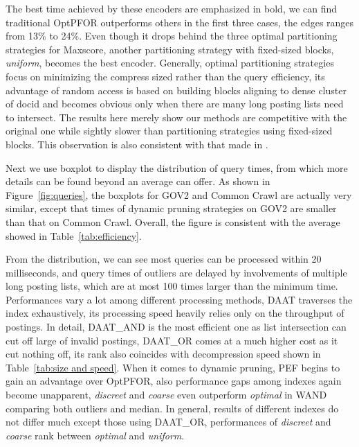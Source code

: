 \documentclass[runningheads,a4paper]{llncs}
\begin{document}
The best time achieved by these encoders are emphasized in bold, we can find traditional OptPFOR outperforms others in the first three cases, the edges ranges from 13\% to 24\%.
Even though it drops behind the three optimal partitioning strategies for Maxscore, another partitioning strategy with fixed-sized blocks, \textit{uniform}, becomes the best encoder.
Generally, optimal partitioning strategies focus on minimizing the compress sized rather than the query efficiency, its advantage of random access is based on building blocks aligning to dense cluster of docid and becomes obvious only when there are many long posting lists need to intersect.
The results here merely show our methods are competitive with the original one while sightly slower than partitioning strategies using fixed-sized blocks.
This observation is also consistent with that made in \cite{ottaviano2014partitioned}.

Next we use boxplot to display the distribution of query times, from which more details can be found beyond an average can offer.
As shown in Figure~\ref{fig:queries}, the boxplots for GOV2 and Common Crawl are actually very similar, except that times of dynamic pruning strategies on GOV2 are smaller than that on Common Crawl.
Overall, the figure is consistent with the average showed in Table~\ref{tab:efficiency}.

From the distribution, we can see most queries can be processed within 20 milliseconds, and query times of outliers are delayed by involvements of multiple long posting lists, which are at most 100 times larger than the minimum time.
Performances vary a lot among different processing methods, DAAT traverses the index exhaustively, its processing speed heavily relies only on the throughput of postings.
In detail, DAAT\_AND is the most efficient one as list intersection can cut off large of invalid postings, DAAT\_OR comes at a much higher cost as it cut nothing off, its rank also coincides with decompression speed shown in Table~\ref{tab:size and speed}.
When it comes to dynamic pruning, PEF begins to gain an advantage over OptPFOR, also performance gaps among indexes again become unapparent, \textit{discreet} and \textit{coarse} even outperform \textit{optimal} in WAND comparing both outliers and median.
In general, results of different indexes do not differ much except those using DAAT\_OR, performances of \textit{discreet} and \textit{coarse} rank between \textit{optimal} and \textit{uniform}.
\end{document}
